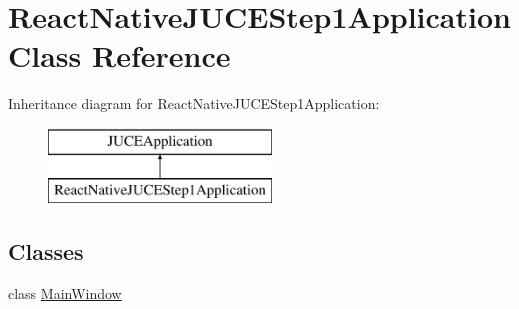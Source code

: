 \hypertarget{class_react_native_j_u_c_e_step1_application}{}\section{React\+Native\+J\+U\+C\+E\+Step1\+Application Class Reference}
\label{class_react_native_j_u_c_e_step1_application}
Inheritance diagram for React\+Native\+J\+U\+C\+E\+Step1\+Application\+:\begin{figure}[H]
\begin{center}
\leavevmode
\includegraphics[height=2.000000cm]{class_react_native_j_u_c_e_step1_application}
\end{center}
\end{figure}
\subsection*{Classes}
\begin{DoxyCompactItemize}
\item 
class \mbox{\hyperlink{class_react_native_j_u_c_e_step1_application_1_1_main_window}{Main\+Window}}
\end{DoxyCompactItemize}
